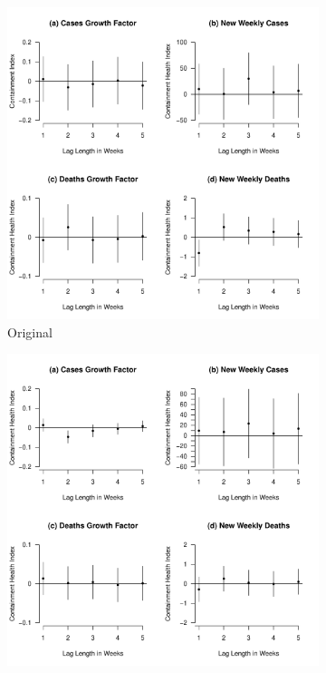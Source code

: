 \documentclass[12pt,letterpaper]{article}
\begin{document}
	\begin{figure}[p]
		\centering
		\begin{subfigure}[t]{0.6\textwidth}
			\centering
			\includegraphics[width=\textwidth]{chi.pdf}
			\caption{Original}
			\label{fig:chi}
		\end{subfigure}
		\vspace{0.5cm} %
		\begin{subfigure}[b]{0.48\textwidth}
			\centering
			\includegraphics[width=\textwidth]{achi.pdf}

\end{subfigure}
\end{figure}
\end{document}
